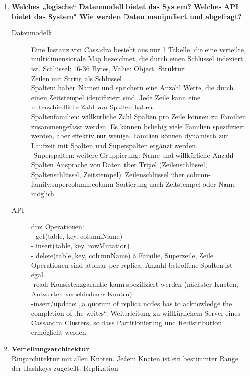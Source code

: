 \documentclass[a4paper,10pt,titlepage=false]{scrreprt}
\begin{document}
\begin{itemize}
\begin{enumerate}
\begin{itemize}
  \end{itemize}
\item \textbf{Welches „logische“ Datenmodell bietet das System? Welches API bietet das System? Wie werden Daten manipuliert und abgefragt?}\\
\begin{description}
  \item[Datenmodell:] Eine Instanz von Cassadra besteht aus nur 1 Tabelle, die eine verteilte, multidimensionale Map bezeichnet, die durch einen Schlüssel indexiert ist. Schlüssel: 16-36 Bytes, Value: Object.
Struktur:\\
 Zeilen mit String als Schlüssel\\
Spalten: haben Namen und speichern eine Anzahl Werte, die durch einen Zeitstempel identifiziert sind. Jede Zeile kann eine unterschiedliche Zahl von Spalten haben.\\
 Spaltenfamilien: willkürliche Zahl Spalten pro Zeile können zu Familien zusammengefasst werden. Es können beliebig viele Familien spezifiziert werden, aber effektiv nur wenige. Familien können dynamisch zur Laufzeit mit Spalten und Superspalten ergänzt werden.\\
-Superspalten: weitere Gruppierung: Name und willkürliche Anzahl Spalten
Ansprache von Daten über Tripel (Zeilenschlüssel, Spaltenschlüssel, Zeitstempel). Zeilenschlüssel über column-family:supercolumn:column
Sortierung nach Zeitstempel oder Name möglich
\item[API:] drei Operationen:\\
- get(table, key, columnName)\\
- insert(table, key, rowMutation)\\
- delete(table, key, columnName) à Familie, Superzeile, Zeile\\
Operationen sind atomar per replica, Anzahl betroffene Spalten ist egal.\\
-read: Konsistenzgarantie kann spezifiziert werden (nächster Knoten, Antworten verschiedener Knoten)\\
-insert/update: „a quorum of replica nodes has to acknowledge the completion of the writes“. Weiterleitung zu willkürlichem Server eines Cassandra Clusters, so dass Partitionierung und Redistribution ermöglicht werden. 
\end{description}
\item \textbf{Verteilungsarchitektur}\\
Ringarchitektur mit allen Knoten. Jedem Knoten ist ein bestimmter Range der Hashkeys zugeteilt.
Replikation\\

\end{enumerate}
\end{itemize}
\end{document}
